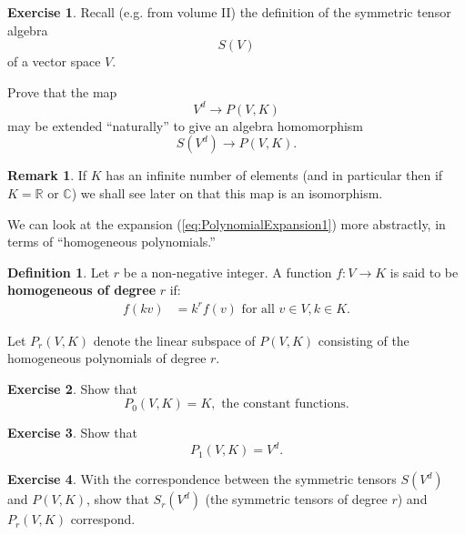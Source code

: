 \documentclass[12pt]{book}
\theoremstyle{plain}
\theoremstyle{definition}
\newtheorem{definition}{Definition}[section]
\newtheorem{exercise}{Exercise}[section]
\newtheorem*{remark}{Remark}
\begin{document}
\begin{exercise}
    Recall (e.g. from volume II) the definition of the symmetric tensor algebra
    $$S(V)$$
    of a vector space $V$.

    Prove that the map
    $$V^d \to P(V, K)$$
    may be extended ``naturally'' to give an algebra homomorphism
    $$S(V^d) \to P(V, K).$$
\end{exercise}

\begin{remark}
    If $K$ has an infinite number of elements (and in particular then if $K = \mathbb{R}$ or $\mathbb{C}$) we shall see later on that this map is an isomorphism.
\end{remark}

We can look at the expansion (\ref{eq:PolynomialExpansion1}) more abstractly, in terms of ``homogeneous polynomials.''

\begin{definition}
    Let $r$ be a non-negative integer.
    A function $f: V \to K$ is said to be \textbf{homogeneous of degree} $r$ if:
    \begin{align}
        f(kv) &= k^rf(v) \text{ for all } v \in V, k \in K.
    \end{align}
\end{definition}

Let $P_r(V, K)$ denote the linear subspace of $P(V, K)$ consisting of the homogeneous polynomials of degree $r$.

\begin{exercise}
    Show that
    $$P_0(V, K) = K, \text{ the constant functions.}$$
\end{exercise}

\begin{exercise}
    Show that
    $$P_1(V, K) = V^d.$$
\end{exercise}

\begin{exercise}
    With the correspondence between the symmetric tensors $S(V^d)$ and $P(V, K)$, show that $S_r(V^d)$ (the symmetric tensors of degree $r$) and $P_r(V, K)$ correspond.
\end{exercise}
\end{document}
